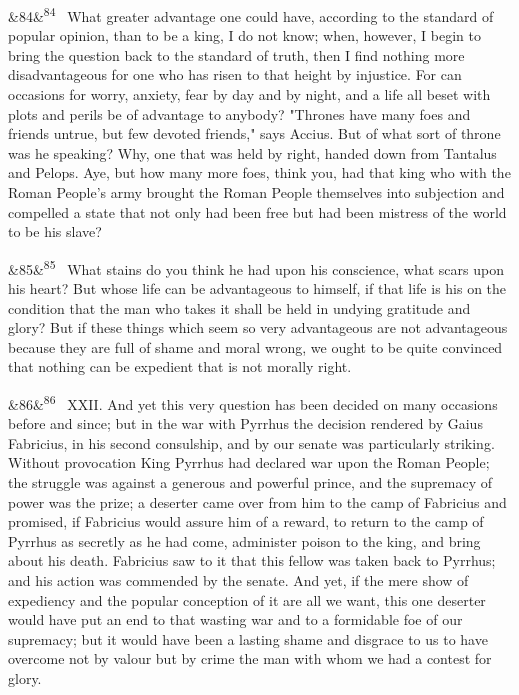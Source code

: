 \documentclass[12pt]{article}
\newcommand{\para}[1][]{\par\noindent\ifx&#1&\else\textsuperscript{\footnotesize #1}~\fi}
\begin{document}
\para[84] What greater advantage one could have, according to the standard of popular opinion, than to be a king, I do not know; when, however, I begin to bring the question back to the standard of truth, then I find nothing more disadvantageous for one who has risen to that height by injustice. For can occasions for worry, anxiety, fear by day and by night, and a life all beset with plots and perils be of advantage to anybody? "Thrones have many foes and friends untrue, but few devoted friends," says Accius. But of what sort of throne was he speaking? Why, one that was held by right, handed down from Tantalus and Pelops. Aye, but how many more foes, think you, had that king who with the Roman People's army brought the Roman People themselves into subjection and compelled a state that not only had been free but had been mistress of the world to be his slave?

\para[85] What stains do you think he had upon his conscience, what scars upon his heart? But whose life can be advantageous to himself, if that life is his on the condition that the man who takes it shall be held in undying gratitude and glory? But if these things which seem so very advantageous are not advantageous because they are full of shame and moral wrong, we ought to be quite convinced that nothing can be expedient that is not morally right.

\para[86] XXII. And yet this very question has been decided on many occasions before and since; but in the war with Pyrrhus the decision rendered by Gaius Fabricius, in his second consulship, and by our senate was particularly striking. Without provocation King Pyrrhus had declared war upon the Roman People; the struggle was against a generous and powerful prince, and the supremacy of power was the prize; a deserter came over from him to the camp of Fabricius and promised, if Fabricius would assure him of a reward, to return to the camp of Pyrrhus as secretly as he had come, administer poison to the king, and bring about his death. Fabricius saw to it that this fellow was taken back to Pyrrhus; and his action was commended by the senate. And yet, if the mere show of expediency and the popular conception of it are all we want, this one deserter would have put an end to that wasting war and to a formidable foe of our supremacy; but it would have been a lasting shame and disgrace to us to have overcome not by valour but by crime the man with whom we had a contest for glory.
\end{document}
